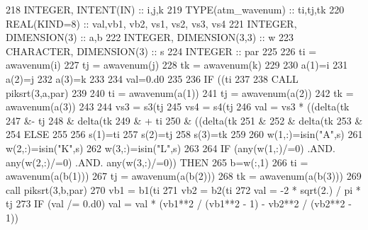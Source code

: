 \begin{DoxyCode}
218     \textcolor{keywordtype}{INTEGER}, \textcolor{keywordtype}{INTENT(IN)} :: i,j,k
219     \textcolor{keywordtype}{TYPE}(atm\_wavenum) :: ti,tj,tk
220     \textcolor{keywordtype}{REAL(KIND=8)} :: val,vb1, vb2, vs1, vs2, vs3, vs4
221     \textcolor{keywordtype}{INTEGER}, \textcolor{keywordtype}{DIMENSION(3)} :: a,b
222     \textcolor{keywordtype}{INTEGER}, \textcolor{keywordtype}{DIMENSION(3,3)} :: w
223     \textcolor{keywordtype}{CHARACTER}, \textcolor{keywordtype}{DIMENSION(3)} :: s
224     \textcolor{keywordtype}{INTEGER} :: par
225 
226     ti = awavenum(i)
227     tj = awavenum(j)
228     tk = awavenum(k)
229 
230     a(1)=i
231     a(2)=j
232     a(3)=k
233 
234     val=0.d0
235 
236     \textcolor{keywordflow}{IF} ((ti%
237        
238        \textcolor{keyword}{CALL }piksrt(3,a,par)
239 
240        ti = awavenum(a(1))
241        tj = awavenum(a(2))
242        tk = awavenum(a(3))
243 
244        vs3 = s3(tj%
245        vs4 = s4(tj%
246        val = vs3 * ((delta(tk%
247             &- tj%
248             & delta(tk%
249             & + ti%
250             & ((delta(tk%
251             &%
252             & delta(tk%
253             &%
254     \textcolor{keywordflow}{ELSE}
255 
256        s(1)=ti%
257        s(2)=tj%
258        s(3)=tk%
259 
260        w(1,:)=isin(\textcolor{stringliteral}{"A"},s)
261        w(2,:)=isin(\textcolor{stringliteral}{"K"},s)
262        w(3,:)=isin(\textcolor{stringliteral}{"L"},s)
263 
264        \textcolor{keywordflow}{IF} (any(w(1,:)/=0) .AND. any(w(2,:)/=0) .AND. any(w(3,:)/=0)) \textcolor{keywordflow}{THEN}
265           b=w(:,1)
266           ti = awavenum(a(b(1)))
267           tj = awavenum(a(b(2)))
268           tk = awavenum(a(b(3)))
269           \textcolor{keyword}{call }piksrt(3,b,par)
270           vb1 = b1(ti%
271           vb2 = b2(ti%
272           val = -2 * sqrt(2.) / pi * tj%
273           \textcolor{keywordflow}{IF} (val /= 0.d0) val = val * (vb1**2 / (vb1**2 - 1) - vb2**2 / (vb2**2 - 1))

\end{DoxyCode}
